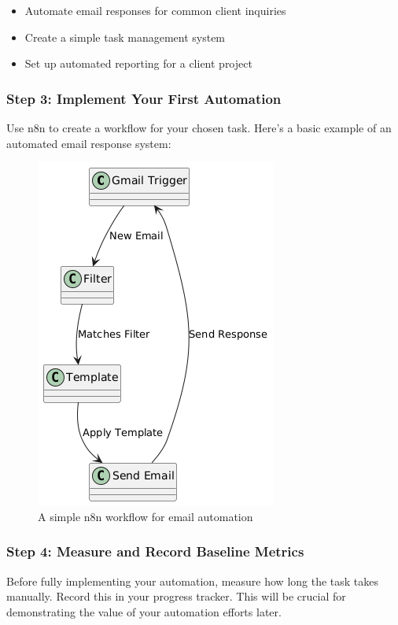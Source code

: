 \begin{itemize}
    \item Automate email responses for common client inquiries
    \item Create a simple task management system
    \item Set up automated reporting for a client project
\end{itemize}

\subsubsection{Step 3: Implement Your First Automation}
Use n8n to create a workflow for your chosen task. Here's a basic example of an automated email response system:


\begin{figure}[H]
    \centering
    \includegraphics{figures/09-gmail-flow-example}
    \caption{A simple n8n workflow for email automation}
    \label{fig:09-gmail-flow-example}
\end{figure}



\subsubsection{Step 4: Measure and Record Baseline Metrics}
Before fully implementing your automation, measure how long the task takes manually. Record this in your progress tracker. This will be crucial for demonstrating the value of your automation efforts later.

